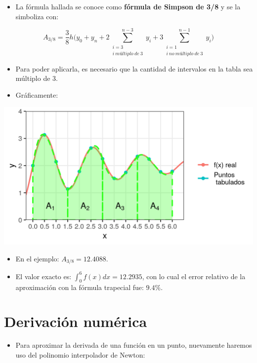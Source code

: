 \documentclass[openany]{book}
\providecommand{\tightlist}{%
  \setlength{\itemsep}{0pt}\setlength{\parskip}{0pt}}
\begin{document}
\begin{itemize}
\tightlist
\item
  La fórmula hallada se conoce como \textbf{fórmula de Simpson de 3/8} y se la simboliza con:
\end{itemize}

\[
A_{3/8} = \frac{3}{8} h \Big( y_0 + y_n + 2 \sum \limits_{\substack{i = 3\\ i~múltiplo~de~3}}^{n-3} y_i + 3 \sum\limits_{\substack{i = 1\\ i~no~múltiplo~de~3}}^{n-1} y_i  \Big)
\]

\begin{itemize}
\item
  Para poder aplicarla, es necesario que la cantidad de intervalos en la tabla sea múltiplo de 3.
\item
  Gráficamente:
\end{itemize}

\begin{center}\includegraphics[width=0.85\linewidth]{Plots/U4/Unidad4_2_g10} \end{center}

\begin{itemize}
\tightlist
\item
  En el ejemplo: \(A_{3/8} = 12.4088\).
\item
  El valor exacto es: \(\int_0^{6}f(x)dx = 12.2935\), con lo cual el error relativo de la aproximación con la fórmula trapecial fue: \(9.4\%\).
\end{itemize}

\hypertarget{derivaciuxf3n-numuxe9rica}{%
\section{Derivación numérica}\label{derivaciuxf3n-numuxe9rica}}

\begin{itemize}
\tightlist
\item
  Para aproximar la derivada de una función en un punto, nuevamente haremos uso del polinomio interpolador de Newton:
\end{itemize}
\end{document}
